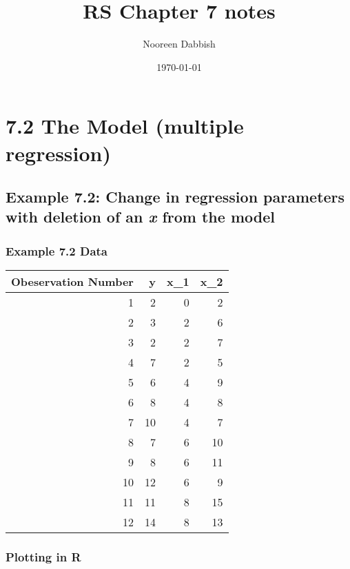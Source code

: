 \documentclass[11pt]{article}
\title{RS Chapter 7 notes}
\author{Nooreen Dabbish}
\date{\today}
\begin{document}
\maketitle

\setcounter{tocdepth}{3}
\tableofcontents
\vspace*{1cm}

\section{7.2 The Model (multiple regression)}
\label{sec-1}
\subsection{Example 7.2: Change in regression parameters with deletion of an \emph{x} from the model}
\label{sec-1-1}
\subsubsection{Example 7.2 Data}
\label{sec-1-1-1}


\begin{center}
\begin{tabular}{rrrr}
 Obeservation Number  &   y  &  x_1  &  x_2  \\
\hline
                   1  &   2  &    0  &    2  \\
                   2  &   3  &    2  &    6  \\
                   3  &   2  &    2  &    7  \\
                   4  &   7  &    2  &    5  \\
                   5  &   6  &    4  &    9  \\
                   6  &   8  &    4  &    8  \\
                   7  &  10  &    4  &    7  \\
                   8  &   7  &    6  &   10  \\
                   9  &   8  &    6  &   11  \\
                  10  &  12  &    6  &    9  \\
                  11  &  11  &    8  &   15  \\
                  12  &  14  &    8  &   13  \\
\end{tabular}
\end{center}
\subsubsection{Plotting in R}
\label{sec-1-1-2}
\end{document}
